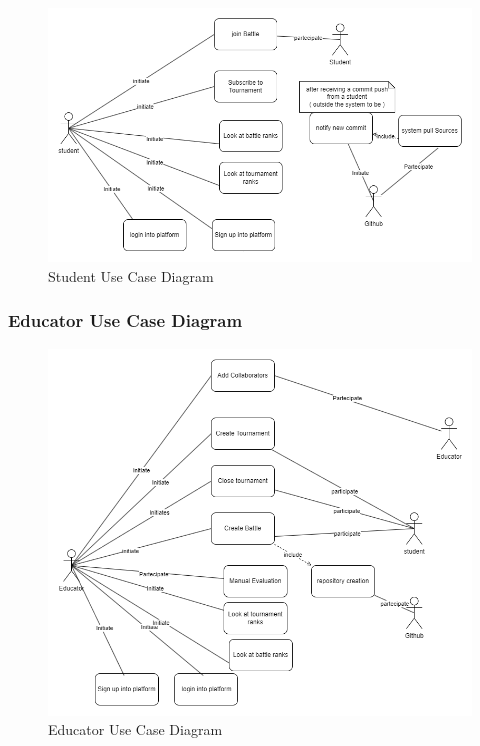 \begin{figure}[H]
    \centering
    \includegraphics[width=1\linewidth]{misc//Images//UC/StudentScenarios.png}
    \caption{Student Use Case Diagram}
    \label{fig:enter-label}
\end{figure}


\subsubsection{Educator Use Case Diagram}
\begin{figure}[H]
    \centering
    \includegraphics[width=1\linewidth]{misc//Images//UC/EducatorScenarios.png}
    \caption{Educator Use Case Diagram}
    \label{fig:enter-label}
\end{figure}

